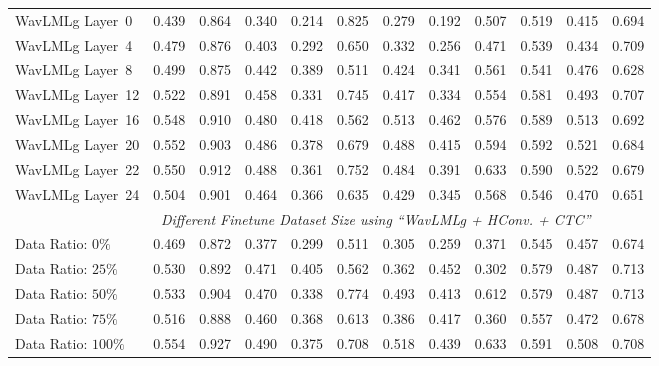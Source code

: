 \begin{table}
\begin{tabular}{lccccccccccc}
WavLMLg Layer~0 & 0.439 & 0.864 &	0.340 &	0.214 &	0.825 &	0.279 &	0.192 &	0.507 & 0.519 & 0.415 & 0.694 \\
WavLMLg Layer~4 & 0.479 & 0.876 &	0.403 &	0.292 &	0.650 &	0.332 &	0.256 &	0.471 & 0.539 & 0.434 & 0.709 \\
WavLMLg Layer~8 & 0.499 & 0.875 &	0.442 &	0.389 &	0.511 &	0.424 &	0.341 &	0.561 & 0.541 & 0.476 & 0.628 \\
WavLMLg Layer~12 & 0.522 & 0.891 &	0.458 &	0.331 &	0.745 &	0.417 &	0.334 &	0.554 & 0.581 & 0.493 & 0.707 \\
WavLMLg Layer~16 & 0.548 & 0.910 &	0.480 &	0.418 &	0.562 &	0.513 &	0.462 &	0.576 & 0.589 & 0.513 & 0.692 \\
WavLMLg Layer~20 & 0.552 & 0.903 &	0.486 &	0.378 &	0.679 &	0.488 &	0.415 &	0.594 & 0.592 & 0.521 & 0.684 \\
WavLMLg Layer~22 &	0.550 &  0.912 &	0.488 &	0.361 &	0.752 &	0.484 &	0.391 &	0.633 &	0.590 &	0.522 &	0.679 \\

WavLMLg Layer~24 & 0.504 & 0.901 &	0.464 &	0.366 &	0.635 &	0.429 &	0.345 &	0.568 & 0.546 & 0.470 & 0.651 \\




\midrule
 & \multicolumn{10}{c}{\textit{Different Finetune Dataset Size using ``WavLMLg + HConv. + CTC''}} \\
\cmidrule(lr){2-12}
Data Ratio: $0\%$  &
 0.469 & 0.872 & 0.377 & 0.299 & 0.511 & 0.305 & 0.259 & 0.371 & 0.545 & 0.457 & 0.674 \\
Data Ratio: $25\%$ &
  0.530 & 0.892 & 0.471 &  0.405 & 0.562 & 0.362 & 0.452 & 0.302 &	0.579 &	0.487 &	0.713 \\
Data Ratio: $50\%$ &
0.533 & 0.904 &	0.470 &	0.338 &	0.774 &	0.493 &	0.413 &	0.612 &	0.579 &	0.487 &	0.713 \\
Data Ratio: $75\%$ &
0.516 & 0.888 &	0.460 &	0.368 &	0.613 &	0.386 &	0.417 &	0.360 &	0.557 &	0.472 &	0.678 \\
Data Ratio: $100\%$ &
0.554 & 0.927  &	0.490 &	0.375 &	0.708 &	0.518 &	0.439 &	0.633 &	0.591 &	0.508 &	0.708 \\









\end{tabular}
\end{table}
